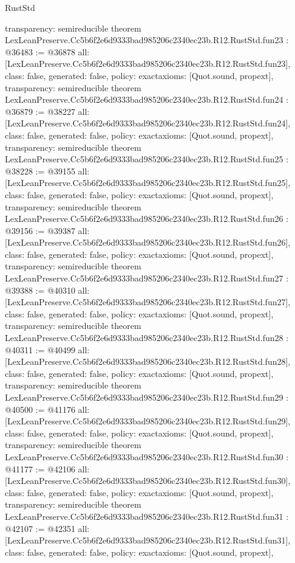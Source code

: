 \begin{lexlean}{RustStd}
\begin{coremodule}
{  transparency: semireducible
}
theorem LexLeanPreserve.Cc5b6f2e6d9333bad985206c2340ec23b.R12.RustStd.fun23 : @36483 := @36878 {
  all: [LexLeanPreserve.Cc5b6f2e6d9333bad985206c2340ec23b.R12.RustStd.fun23],
  class: false,
  generated: false,
  policy: exact{axioms: [Quot.sound, propext]},
  transparency: semireducible
}
theorem LexLeanPreserve.Cc5b6f2e6d9333bad985206c2340ec23b.R12.RustStd.fun24 : @36879 := @38227 {
  all: [LexLeanPreserve.Cc5b6f2e6d9333bad985206c2340ec23b.R12.RustStd.fun24],
  class: false,
  generated: false,
  policy: exact{axioms: [Quot.sound, propext]},
  transparency: semireducible
}
theorem LexLeanPreserve.Cc5b6f2e6d9333bad985206c2340ec23b.R12.RustStd.fun25 : @38228 := @39155 {
  all: [LexLeanPreserve.Cc5b6f2e6d9333bad985206c2340ec23b.R12.RustStd.fun25],
  class: false,
  generated: false,
  policy: exact{axioms: [Quot.sound, propext]},
  transparency: semireducible
}
theorem LexLeanPreserve.Cc5b6f2e6d9333bad985206c2340ec23b.R12.RustStd.fun26 : @39156 := @39387 {
  all: [LexLeanPreserve.Cc5b6f2e6d9333bad985206c2340ec23b.R12.RustStd.fun26],
  class: false,
  generated: false,
  policy: exact{axioms: [Quot.sound, propext]},
  transparency: semireducible
}
theorem LexLeanPreserve.Cc5b6f2e6d9333bad985206c2340ec23b.R12.RustStd.fun27 : @39388 := @40310 {
  all: [LexLeanPreserve.Cc5b6f2e6d9333bad985206c2340ec23b.R12.RustStd.fun27],
  class: false,
  generated: false,
  policy: exact{axioms: [Quot.sound, propext]},
  transparency: semireducible
}
theorem LexLeanPreserve.Cc5b6f2e6d9333bad985206c2340ec23b.R12.RustStd.fun28 : @40311 := @40499 {
  all: [LexLeanPreserve.Cc5b6f2e6d9333bad985206c2340ec23b.R12.RustStd.fun28],
  class: false,
  generated: false,
  policy: exact{axioms: [Quot.sound, propext]},
  transparency: semireducible
}
theorem LexLeanPreserve.Cc5b6f2e6d9333bad985206c2340ec23b.R12.RustStd.fun29 : @40500 := @41176 {
  all: [LexLeanPreserve.Cc5b6f2e6d9333bad985206c2340ec23b.R12.RustStd.fun29],
  class: false,
  generated: false,
  policy: exact{axioms: [Quot.sound, propext]},
  transparency: semireducible
}
theorem LexLeanPreserve.Cc5b6f2e6d9333bad985206c2340ec23b.R12.RustStd.fun30 : @41177 := @42106 {
  all: [LexLeanPreserve.Cc5b6f2e6d9333bad985206c2340ec23b.R12.RustStd.fun30],
  class: false,
  generated: false,
  policy: exact{axioms: [Quot.sound, propext]},
  transparency: semireducible
}
theorem LexLeanPreserve.Cc5b6f2e6d9333bad985206c2340ec23b.R12.RustStd.fun31 : @42107 := @42351 {
  all: [LexLeanPreserve.Cc5b6f2e6d9333bad985206c2340ec23b.R12.RustStd.fun31],
  class: false,
  generated: false,
  policy: exact{axioms: [Quot.sound, propext]},
}
\end{coremodule}
\end{lexlean}

